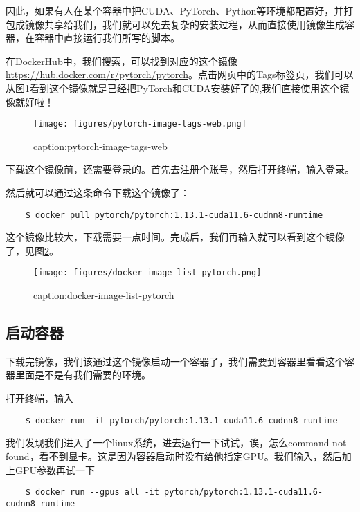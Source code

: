 因此，如果有人在某个容器中把CUDA、PyTorch、Python等环境都配置好，并打包成镜像共享给我们，我们就可以免去复杂的安装过程，从而直接使用镜像生成容器，在容器中直接运行我们所写的脚本。

在DockerHub中，我们搜索，可以找到对应的这个镜像\url{https://hub.docker.com/r/pytorch/pytorch}。点击网页中的Tags标签页，我们可以从图\ref{fig:pytorch-image-tags-web}看到这个镜像就是已经把PyTorch和CUDA安装好了的,我们直接使用这个镜像就好啦！

\begin{figure}[htbp]
	\centering
	\texttt{[image: figures/pytorch-image-tags-web.png]}
	\caption{caption:pytorch-image-tags-web}
	\label{fig:pytorch-image-tags-web}
\end{figure}

下载这个镜像前，还需要登录的。首先去注册个账号，然后打开终端，输入登录。

然后就可以通过这条命令下载这个镜像了：

\begin{lstlisting}
    $ docker pull pytorch/pytorch:1.13.1-cuda11.6-cudnn8-runtime
\end{lstlisting}


这个镜像比较大，下载需要一点时间。完成后，我们再输入就可以看到这个镜像了，见图\ref{fig:docker-image-list-pytorch}。
\begin{figure}[htbp]
	\centering
	\texttt{[image: figures/docker-image-list-pytorch.png]}
	\caption{caption:docker-image-list-pytorch}
	\label{fig:docker-image-list-pytorch}
\end{figure}

\subsection{启动容器}

下载完镜像，我们该通过这个镜像启动一个容器了，我们需要到容器里看看这个容器里面是不是有我们需要的环境。

打开终端，输入
\begin{lstlisting}
    $ docker run -it pytorch/pytorch:1.13.1-cuda11.6-cudnn8-runtime
\end{lstlisting}
我们发现我们进入了一个linux系统，进去运行一下试试，诶，怎么command not found，看不到显卡。这是因为容器启动时没有给他指定GPU。我们输入，然后加上GPU参数再试一下
\begin{lstlisting}
    $ docker run --gpus all -it pytorch/pytorch:1.13.1-cuda11.6-cudnn8-runtime 
\end{lstlisting}

